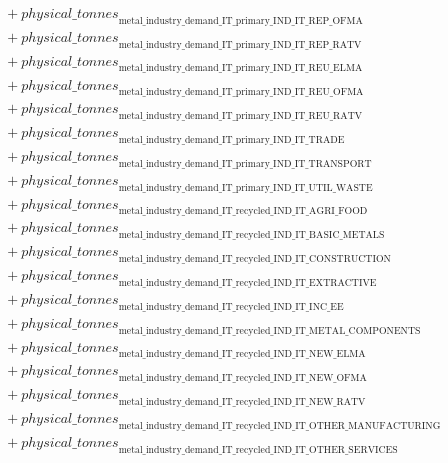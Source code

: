 \documentclass[11pt]{article}
\begin{document}
\begin{align*}
&\quad {}+ {physical\_tonnes}_{\text{metal\_industry\_demand\_IT\_primary\_IND\_IT\_REP\_OFMA}}\\
&\quad {}+ {physical\_tonnes}_{\text{metal\_industry\_demand\_IT\_primary\_IND\_IT\_REP\_RATV}}\\
&\quad {}+ {physical\_tonnes}_{\text{metal\_industry\_demand\_IT\_primary\_IND\_IT\_REU\_ELMA}}\\
&\quad {}+ {physical\_tonnes}_{\text{metal\_industry\_demand\_IT\_primary\_IND\_IT\_REU\_OFMA}}\\
&\quad {}+ {physical\_tonnes}_{\text{metal\_industry\_demand\_IT\_primary\_IND\_IT\_REU\_RATV}}\\
&\quad {}+ {physical\_tonnes}_{\text{metal\_industry\_demand\_IT\_primary\_IND\_IT\_TRADE}}\\
&\quad {}+ {physical\_tonnes}_{\text{metal\_industry\_demand\_IT\_primary\_IND\_IT\_TRANSPORT}}\\
&\quad {}+ {physical\_tonnes}_{\text{metal\_industry\_demand\_IT\_primary\_IND\_IT\_UTIL\_WASTE}}\\
&\quad {}+ {physical\_tonnes}_{\text{metal\_industry\_demand\_IT\_recycled\_IND\_IT\_AGRI\_FOOD}}\\
&\quad {}+ {physical\_tonnes}_{\text{metal\_industry\_demand\_IT\_recycled\_IND\_IT\_BASIC\_METALS}}\\
&\quad {}+ {physical\_tonnes}_{\text{metal\_industry\_demand\_IT\_recycled\_IND\_IT\_CONSTRUCTION}}\\
&\quad {}+ {physical\_tonnes}_{\text{metal\_industry\_demand\_IT\_recycled\_IND\_IT\_EXTRACTIVE}}\\
&\quad {}+ {physical\_tonnes}_{\text{metal\_industry\_demand\_IT\_recycled\_IND\_IT\_INC\_EE}}\\
&\quad {}+ {physical\_tonnes}_{\text{metal\_industry\_demand\_IT\_recycled\_IND\_IT\_METAL\_COMPONENTS}}\\
&\quad {}+ {physical\_tonnes}_{\text{metal\_industry\_demand\_IT\_recycled\_IND\_IT\_NEW\_ELMA}}\\
&\quad {}+ {physical\_tonnes}_{\text{metal\_industry\_demand\_IT\_recycled\_IND\_IT\_NEW\_OFMA}}\\
&\quad {}+ {physical\_tonnes}_{\text{metal\_industry\_demand\_IT\_recycled\_IND\_IT\_NEW\_RATV}}\\
&\quad {}+ {physical\_tonnes}_{\text{metal\_industry\_demand\_IT\_recycled\_IND\_IT\_OTHER\_MANUFACTURING}}\\
&\quad {}+ {physical\_tonnes}_{\text{metal\_industry\_demand\_IT\_recycled\_IND\_IT\_OTHER\_SERVICES}}\\

\end{align*}
\end{document}
